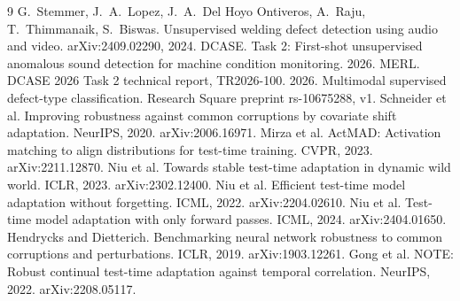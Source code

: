 \documentclass[11pt]{article}
\begin{document}
\newpage
\begin{thebibliography}{9}
 G.~Stemmer, J.~A.~Lopez, J.~A.~Del Hoyo Ontiveros, A.~Raju, T.~Thimmanaik, S.~Biswas. Unsupervised welding defect detection using audio and video. arXiv:2409.02290, 2024.
 DCASE. Task 2: First-shot unsupervised anomalous sound detection for machine condition monitoring. 2026.
 MERL. DCASE 2026 Task 2 technical report, TR2026-100. 2026.
 Multimodal supervised defect-type classification. Research Square preprint rs-10675288, v1.
 Schneider et al. Improving robustness against common corruptions by covariate shift adaptation. NeurIPS, 2020. arXiv:2006.16971.
 Mirza et al. ActMAD: Activation matching to align distributions for test-time training. CVPR, 2023. arXiv:2211.12870.
 Niu et al. Towards stable test-time adaptation in dynamic wild world. ICLR, 2023. arXiv:2302.12400.
 Niu et al. Efficient test-time model adaptation without forgetting. ICML, 2022. arXiv:2204.02610.
 Niu et al. Test-time model adaptation with only forward passes. ICML, 2024. arXiv:2404.01650.
 Hendrycks and Dietterich. Benchmarking neural network robustness to common corruptions and perturbations. ICLR, 2019. arXiv:1903.12261.
 Gong et al. NOTE: Robust continual test-time adaptation against temporal correlation. NeurIPS, 2022. arXiv:2208.05117.
\end{thebibliography}
\end{document}
